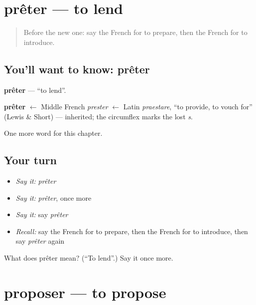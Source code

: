 \section[prêter]{prêter — to lend}

\label{lesson:FR-C180-preter}



\begin{quote}
Before the new one: say the French for to prepare, then the French for to introduce.
\end{quote}

\subsection*{You'll want to know: prêter}
\textbf{prêter} — \textquotedblleft{}to lend\textquotedblright{}.

\begin{cousinweb}
\textbf{prêter} $\leftarrow$ Middle French \emph{prester} $\leftarrow$ Latin \emph{praestare}, \textquotedblleft{}to provide, to vouch for\textquotedblright{} (Lewis \& Short) — inherited; the circumflex marks the lost \emph{s}.
\end{cousinweb}

\begin{grammarlens}[title={What you've built}]
One more word for this chapter.
\end{grammarlens}

\subsection*{Your turn}
\begin{itemize}
\raggedright
  \item \emph{Say it:} \emph{prêter}
  \item \emph{Say it:} \emph{prêter}, once more
  \item \emph{Say it:} say \emph{prêter}
  \item \emph{Recall:} say the French for to prepare, then the French for to introduce, then say \emph{prêter} again
\end{itemize}

\begin{tcolorbox}[breakable,colback=teal!4,colframe=teal!35!black,title={Before you move on}]
What does prêter mean? (\textquotedblleft{}To lend\textquotedblright{}.) Say it once more.
\end{tcolorbox}
\section[proposer]{proposer — to propose}

